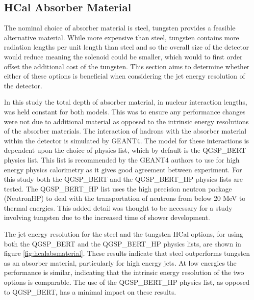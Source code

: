 
\subsection{HCal Absorber Material}
\label{sec:hcalabsorbermaterial}
The nominal choice of absorber material is steel, tungsten provides a feasible alternative material.  While more expensive than steel, tungsten contains more radiation lengths per unit length than steel and so the overall size of the detector would reduce meaning the solenoid could be smaller, which would to first order offset the additional cost of the tungsten.  This section aims to determine whether either of these options is beneficial when considering the jet energy resolution of the detector.

In this study the total depth of absorber material, in nuclear interaction lengths, was held constant for both models.  This was to ensure any performance changes were not due to additional material as opposed to the intrinsic energy resolutions of the absorber materials.  The interaction of hadrons with the absorber material within the detector is simulated by GEANT4.  The model for these interactions is dependent upon the choice of physics list, which by default is the QGSP\_BERT physics list.  This list is recommended by the GEANT4 authors to use for high energy physics calorimetry as it gives good agreement between experiment.  For this study both the QGSP\_BERT and the QGSP\_BERT\_HP physics lists are tested.  The QGSP\_BERT\_HP list uses the high precision neutron package (NeutronHP) to deal with the transportation of neutrons from below 20 MeV to thermal energies.  This added detail was thought to be necessary for a study involving tungsten due to the increased time of shower development.    

The jet energy resolution for the steel and the tungsten HCal options, for using both the QGSP\_BERT and the QGSP\_BERT\_HP physics lists, are shown in figure \ref{fig:hcalabsmaterial}.  These results indicate that steel outperforms tungsten as an absorber material, particularly for high energy jets.  At low energies the performance is similar, indicating that the intrinsic energy resolution of the two options is comparable.  The use of the QGSP\_BERT\_HP physics list, as opposed to QGSP\_BERT, has a minimal impact on these results.


